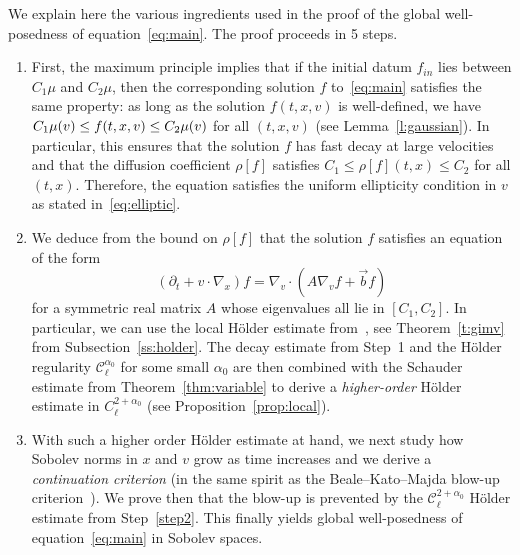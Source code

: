 \documentclass[AHL,Unicode,longabstracts,published]{cedram}
\newcommand{\cC}{\mathcal{C}}
\begin{document}
We explain here the various ingredients used in the proof of the global well-posedness of equation~\eqref{eq:main}. The proof proceeds in 5 steps.
\begin{enumerate}
\item \label{1.4.1} First, the maximum principle implies that if the initial datum $f_{in}$ lies between $C_1 \mu$ and $C_2 \mu$, then the corresponding solution $f$ to~\eqref{eq:main} satisfies the same property: as long as the solution $f(t,x,v)$ is well-defined, we have $C_1 \mu (v) \linebreak\le f(t,x,v) \le C_2 \mu (v)$ for all $(t,x,v)$ (see Lemma~\ref{l:gaussian}). In particular, this ensures that the solution $f$ has fast decay at large velocities and that the diffusion coefficient $\rho [f]$ satisfies $C_1 \le \rho [f](t,x) \le C_2$ for all $(t,x)$. Therefore, the equation satisfies the uniform ellipticity condition in $v$ as stated in~\eqref{eq:elliptic}.
\item \label{1.4.2} We deduce from the bound on $\rho [f]$ that the solution $f$ satisfies an equation of the form
\[
(\partial_t + v \cdot \nabla_x) f = \nabla_v \cdot (A \nabla_v f+
\vec b f)
\]
for a symmetric real matrix $A$ whose eigenvalues all lie in $[C_1,C_2]$. In particular, we can use the local H\"older estimate from~\cite{gimv,wz09}, see Theorem~\ref{t:gimv} from Subsection~\ref{ss:holder}. The decay estimate from Step~1 and the H\"older regularity $\cC_\ell^{\alpha_0}$ for some small $\alpha_0$ are then combined with the Schauder estimate from Theorem~\ref{thm:variable} to derive a \emph{higher-order} H\"older estimate in $C^{2+\alpha_0}_\ell$ (see Proposition~\ref{prop:local}).
\item \label{1.4.3} With such a higher order H\"older estimate at hand, we next study how Sobolev norms in $x$ and $v$ grow as time increases and we derive a \emph{continuation criterion} (in the same spirit as the Beale--Kato--Majda blow-up criterion~\cite{MR763762}). We prove then that the blow-up is prevented by the $\cC_\ell^{2+\alpha_0}$ H\"older estimate from Step~\ref{step2}. This finally yields global well-posedness of equation~\eqref{eq:main} in Sobolev spaces.
\end{enumerate}
\end{document}
